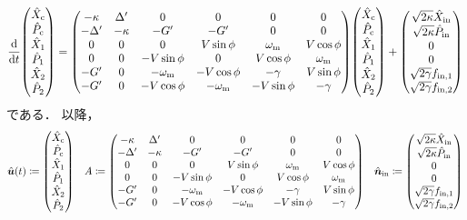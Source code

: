 \documentclass{report}
\begin{document}
    \begin{align}
      \dv{t}\mqty(\hat{X}_{\r{c}} \\ \hat{P}_{\r{c}} \\ \hat{X}_{1} \\ \hat{P}_{1} \\ \hat{X}_{2} \\ \hat{P}_{2}) =
      \mqty(-\kappa & \Delta' & 0 & 0 & 0 & 0 \\
        -\Delta' & -\kappa & -G' & -G' & 0 & 0 \\
        0 & 0 & 0 & V \sin\phi & \omega_{\r{m}} & V \cos\phi \\
        0 & 0 & -V \sin\phi & 0 & V \cos\phi & \omega_{\r{m}} \\
        -G' & 0 & -\omega_{\r{m}} & -V \cos\phi & -\gamma & V \sin\phi \\
        -G' & 0 & -V \cos\phi & -\omega_{\r{m}} & -V \sin\phi & -\gamma)\mqty(\hat{X}_{\r{c}} \\ \hat{P}_{\r{c}} \\ \hat{X}_{1} \\ \hat{P}_{1} \\ \hat{X}_{2} \\ \hat{P}_{2})
        +\mqty(\sqrt{2\kappa}\hat{X}_{\r{in}} \\ \sqrt{2\kappa}\hat{P}_{\r{in}} \\ 0 \\ 0 \\ \sqrt{2\gamma}f_{\r{in, 1}} \\ \sqrt{2\gamma}f_{\r{in, 2}})
    \end{align}
    である．
    以降，
    \begin{align}
      \hat{\bm{u}}(t) \coloneqq\mqty(\hat{X}_{\r{c}} \\ \hat{P}_{\r{c}} \\ \hat{X}_{1} \\ \hat{P}_{1} \\ \hat{X}_{2} \\ \hat{P}_{2}) \quad A \coloneq \mqty(-\kappa & \Delta' & 0 & 0 & 0 & 0 \\
        -\Delta' & -\kappa & -G' & -G' & 0 & 0 \\
        0 & 0 & 0 & V \sin\phi & \omega_{\r{m}} & V \cos\phi \\
        0 & 0 & -V \sin\phi & 0 & V \cos\phi & \omega_{\r{m}} \\
        -G' & 0 & -\omega_{\r{m}} & -V \cos\phi & -\gamma & V \sin\phi \\
        -G' & 0 & -V \cos\phi & -\omega_{\r{m}} & -V \sin\phi & -\gamma) \quad
      \hat{\bm{n}}_{\r{in}} \coloneqq\mqty(\sqrt{2\kappa}\hat{X}_{\r{in}} \\ \sqrt{2\kappa}\hat{P}_{\r{in}} \\ 0 \\ 0 \\ \sqrt{2\gamma}f_{\r{in, 1}} \\ \sqrt{2\gamma}f_{\r{in, 2}})
    \end{align}
\end{document}
